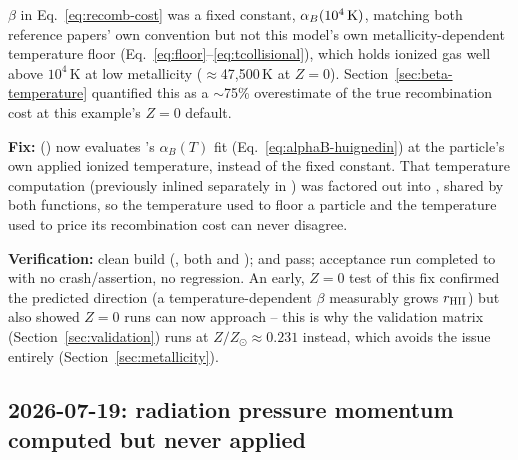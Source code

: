 $\beta$ in Eq.~\ref{eq:recomb-cost} was a fixed constant,
$\alpha_B(10^4\,{\rm K})$, matching both reference papers' own
convention but not this model's own metallicity-dependent temperature
floor (Eq.~\ref{eq:floor}--\ref{eq:tcollisional}), which holds ionized
gas well above $10^4\,$K at low metallicity ($\approx$47,500\,K at
$Z=0$). Section~\ref{sec:beta-temperature} quantified this as a
$\sim$75\% overestimate of the true recombination cost at this
example's $Z=0$ default.

\textbf{Fix:} 
() now evaluates
\citet{HuiGnedin1997}'s $\alpha_B(T)$ fit
(Eq.~\ref{eq:alphaB-huignedin}) at the particle's own applied ionized
temperature, instead of the fixed constant. That temperature
computation (previously inlined separately in
) was factored out into
, shared by both
functions, so the temperature used to floor a particle and the
temperature used to price its recombination cost can never disagree.

\textbf{Verification:} clean build (, both 
and );  and
 pass;
  acceptance run completed to
 with no crash/assertion, no regression. An early,
$Z=0$ test of this fix confirmed the predicted direction (a
temperature-dependent $\beta$ measurably grows $r_{\rm HII}$) but also
showed $Z=0$ runs can now approach
 -- this is why the validation
matrix (Section~\ref{sec:validation}) runs at
$Z/Z_\odot\approx0.231$ instead, which avoids the issue entirely
(Section~\ref{sec:metallicity}).

\subsection{2026-07-19: radiation pressure momentum computed but never applied}
\label{sec:rp-hit-flag-bug}

